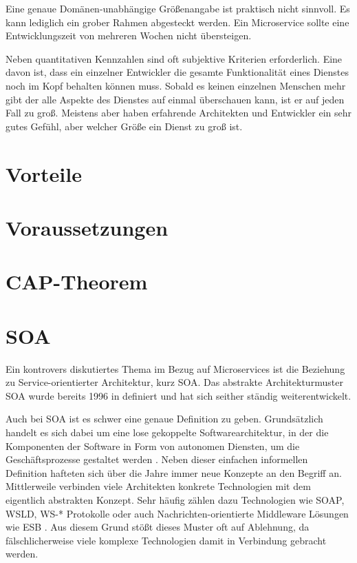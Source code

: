 Eine genaue Domänen-unabhängige Größenangabe ist praktisch nicht sinnvoll. Es kann lediglich ein grober Rahmen abgesteckt werden. Ein Microservice sollte eine Entwicklungszeit von mehreren Wochen nicht übersteigen.

Neben quantitativen Kennzahlen sind oft subjektive Kriterien erforderlich. Eine davon ist, dass ein einzelner Entwickler die gesamte Funktionalität eines Dienstes noch im Kopf behalten können muss. Sobald es keinen einzelnen Menschen mehr gibt der alle Aspekte des Dienstes auf einmal überschauen kann, ist er auf jeden Fall zu groß. Meistens aber haben erfahrende Architekten und Entwickler ein sehr gutes Gefühl, aber welcher Größe ein Dienst zu groß ist.

\section{Vorteile}

\section{Voraussetzungen}

\section{CAP-Theorem}

\section{SOA}

Ein kontrovers diskutiertes Thema im Bezug auf Microservices ist die Beziehung zu Service-orientierter Architektur, kurz SOA. Das abstrakte Architekturmuster SOA wurde bereits 1996 in \cite{schulte1996service} definiert und hat sich seither ständig weiterentwickelt.

Auch bei SOA ist es schwer eine genaue Definition zu geben. Grundsätzlich handelt es sich dabei um eine lose gekoppelte Softwarearchitektur, in der die Komponenten der Software in Form von autonomen Diensten, um die Geschäftsprozesse gestaltet werden \cite{soaRW}. Neben dieser einfachen informellen Definition hafteten sich über die Jahre immer neue Konzepte an den Begriff an. Mittlerweile verbinden viele Architekten konkrete Technologien mit dem eigentlich abstrakten Konzept. Sehr häufig zählen dazu Technologien wie SOAP, WSLD, WS-* Protokolle oder auch Nachrichten-orientierte Middleware Lösungen wie ESB \cite{fowlerGoTo}. Aus diesem Grund stößt dieses Muster oft auf Ablehnung, da fälschlicherweise viele komplexe Technologien damit in Verbindung gebracht werden.

